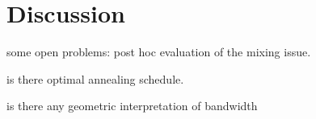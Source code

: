 \section{Discussion} \label{sec:discuss}
some open problems: post hoc evaluation of the mixing issue. 

is there optimal annealing schedule.

is there any geometric interpretation of bandwidth